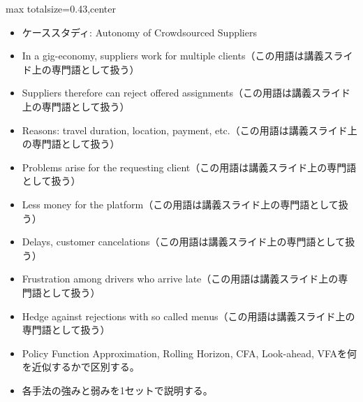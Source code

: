 \clearpage
{}
\begin{minipage}[t]{0.405\textwidth}
\begin{adjustbox}{max totalsize={\textwidth}{0.43\textheight},center}
\begin{minipage}{\textwidth}\scriptsize
{}\begin{itemize}
\item ケーススタディ: Autonomy of Crowdsourced Suppliers
\item In a gig-economy, suppliers work for multiple clients（この用語は講義スライド上の専門語として扱う）
\item Suppliers therefore can reject offered assignments（この用語は講義スライド上の専門語として扱う）
\item Reasons: travel duration, location, payment, etc.（この用語は講義スライド上の専門語として扱う）
\item Problems arise for the requesting client（この用語は講義スライド上の専門語として扱う）
\item Less money for the platform（この用語は講義スライド上の専門語として扱う）
\item Delays, customer cancelations（この用語は講義スライド上の専門語として扱う）
\item Frustration among drivers who arrive late（この用語は講義スライド上の専門語として扱う）
\item Hedge against rejections with so called menus（この用語は講義スライド上の専門語として扱う）
\end{itemize}\begin{itemize}
\item Policy Function Approximation, Rolling Horizon, CFA, Look-ahead, VFAを何を近似するかで区別する。
\item 各手法の強みと弱みを1セットで説明する。
\end{itemize}
\end{minipage}
\end{adjustbox}
\end{minipage}\hfill
